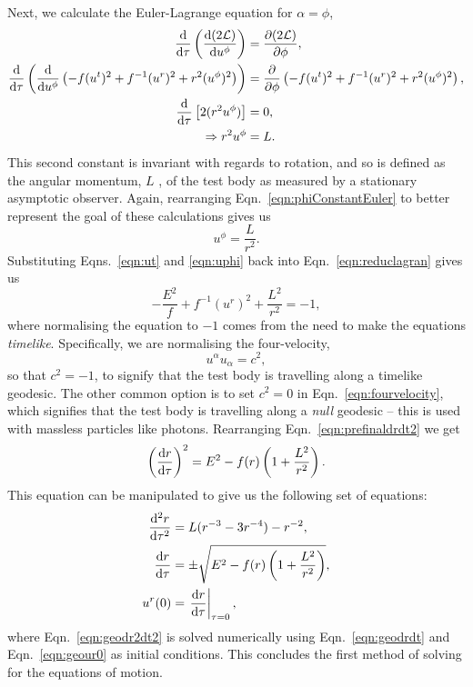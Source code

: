 Next, we calculate the Euler-Lagrange equation for $\alpha=\phi$,
\begin{align}
    \dv{}{\tau}\left(\dv{(2\mathcal{L})}{u^\phi} \right)&=\pdv{(2\mathcal{L})}{\phi},\\
    \dv{}{\tau}\left(\dv{}{u^\phi}\left( -f(u^t)^2+f^{-1}(u^r)^2+r^2(u^\phi)^2\right) \right)&=\pdv{}{\phi}\left( -f(u^t)^2+f^{-1}(u^r)^2+r^2(u^\phi)^2\right),\\
    \dv{}{\tau}\left[2(r^2u^\phi) \right]&=0,\\
    \Rightarrow r^2u^\phi&=L. \label{eqn:phiConstantEuler}
\end{align}
This second constant is invariant with regards to rotation, and so is defined as the angular momentum, $L$ \cite{introCondensed}, of the test body as measured by a stationary asymptotic observer.
Again, rearranging Eqn.~\eqref{eqn:phiConstantEuler} to better represent the goal of these calculations gives us
\begin{equation}\label{eqn:uphi}
    u^\phi=\frac{L}{r^2}.
\end{equation}
Substituting Eqns.~\eqref{eqn:ut} and \eqref{eqn:uphi} back into Eqn.~\eqref{eqn:reduclagran} gives us
\begin{equation}\label{eqn:prefinaldrdt2}
-\frac{E^2}{f}+f^{-1}(u^r)^2+\frac{L^2}{r^2}=-1,
\end{equation}
where normalising the equation to $-1$ comes from the need to make the equations \textit{timelike}.
Specifically, we are normalising the four-velocity,
\begin{equation}\label{eqn:fourvelocity}
u^\alpha u_\alpha=c^2,
\end{equation}
so that $c^2=-1$, to signify that the test body is travelling along a timelike geodesic.
The other common option is to set $c^2=0$ in Eqn.~\eqref{eqn:fourvelocity}, which signifies that the test body is travelling along a \textit{null} geodesic -- this is used with massless particles like photons.
Rearranging Eqn.~\eqref{eqn:prefinaldrdt2} we get
\begin{equation}\label{eqn:drdt2}
\left(\dv{r}{\tau}\right)^2=E^2-f(r)\left(1+\frac{L^2}{r^2}\right).
\end{equation}
This equation can be manipulated to give us the following set of equations:
\begin{align}
    \dv[2]{r}{\tau}&=L(r^{-3}-3r^{-4})-r^{-2},\label{eqn:geodr2dt2}\\
    \dv{r}{\tau}&=\pm\sqrt{E^2-f(r)\left(1+\frac{L^2}{r^2}\right)},\label{eqn:geodrdt} \\
    u^r(0)&=\left.\dv{r}{\tau}(0)\right|_{\tau=0},\label{eqn:geour0}
\end{align}
where Eqn.~\eqref{eqn:geodr2dt2} is solved numerically using Eqn.~\eqref{eqn:geodrdt} and Eqn.~\eqref{eqn:geour0} as initial conditions. This concludes the first method of solving for the equations of motion.

